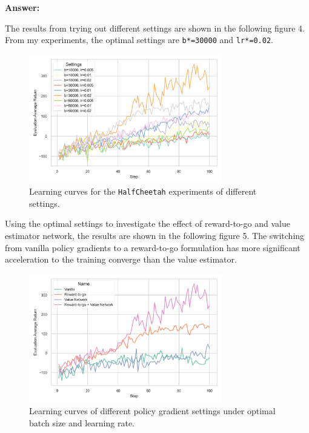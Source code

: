 \documentclass[10pt, letterpaper]{article}
\begin{document}
    \textbf{Answer:}

    The results from trying out different settings are shown in the following figure 4. From my experiments, the optimal settings are \texttt{b*=30000} and \texttt{lr*=0.02}.

    \begin{figure}[h!]
        \centering
        \includegraphics[width=0.75\textwidth]{exp_04_1.png}
        \caption{Learning curves for the \texttt{HalfCheetah} experiments of different settings.}
        \label{fig:4}
    \end{figure}

    Using the optimal settings to investigate the effect of reward-to-go and value estimator network, the results are shown in the following figure 5.
    The switching from vanilla policy gradients to a reward-to-go formulation has more significant acceleration to the training converge than the value estimator.

    \begin{figure}[h!]
        \centering
        \includegraphics[width=0.75\textwidth]{exp_04_2.png} 
        \caption{Learning curves of different policy gradient settings under optimal batch size and learning rate.}
        \label{fig:5}
    \end{figure}
\end{document}
